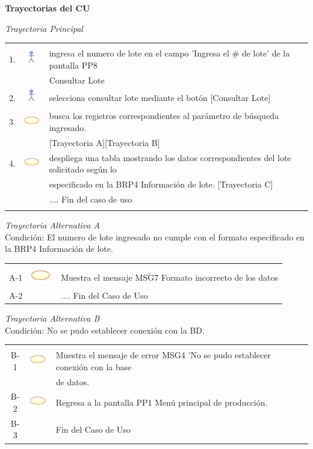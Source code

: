 \documentclass[10pt,spanish]{article}
\providecommand{\tabularnewline}{\\}
\begin{document}
	\textbf{\large Trayectorias del CU}{\large \par}
	\textit{\large Trayectoria Principal}{\large{} }{\large \par}
	\begin{tabular}{ccl}
	 &  & \tabularnewline
	1. & \includegraphics{actor} & ingresa el numero de lote en el campo 'Ingresa el \# de lote' de la pantalla PP8\tabularnewline
	& &  Consultar Lote \tabularnewline
	2. & \includegraphics{actor} & selecciona consultar lote mediante el botón [Consultar Lote]\tabularnewline 
	3. & \includegraphics{sistema} & busca los registros correspondientes al parámetro de búsqueda ingresado. \tabularnewline
	& & [Trayectoria A][Trayectoria B]\tabularnewline
	4. & \includegraphics{sistema} & despliega una tabla mostrando los datos correspondientes del lote solicitado según lo\tabularnewline
	& & especificado en la BRP4 Información de lote. [Trayectoria C]\tabularnewline
	 &  & .... Fin del caso de uso\tabularnewline \\
	\end{tabular}	
	\newpage
	\textit{Trayectoria Alternativa A}\\
	Condición: El numero de lote ingresado no cumple con el formato especificado en la BRP4 Información de lote.\\
	\begin{tabular}{ccl}
	& & \tabularnewline
	A-1 & \includegraphics{sistema} & Muestra el mensaje MSG7 Formato incorrecto de los datos\tabularnewline	
	A-2 & & .... Fin del Caso de Uso\tabularnewline
	\end{tabular}	

	\textit{Trayectoria Alternativa B}\\
	Condición: No se pudo establecer conexión con la BD.\\
	\begin{tabular}{ccl}
	& & \tabularnewline
	B-1 & \includegraphics{sistema} & Muestra el mensaje de error MSG4 'No se pudo establecer conexión con la base\tabularnewline
	& & de datos.\tabularnewline
	B-2 & \includegraphics{sistema} & Regresa a la pantalla PP1 Menú principal de producción.\tabularnewline
	B-3 & & Fin del Caso de Uso\tabularnewline	
	\end{tabular}	
	
\end{document}
